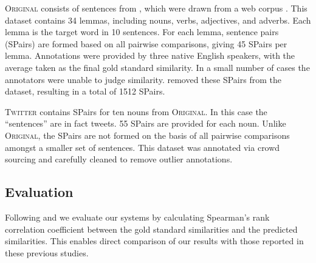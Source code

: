 \documentclass[11pt]{article}
\newcommand\original{\textsc{Original}\xspace}
\newcommand\twitter{\textsc{Twitter}\xspace}
\begin{document}
\original consists of sentences from \cite{McCarthy:Navigli:2007},
which were drawn from a web corpus \citep{Sharoff2006b}. This dataset
contains 34 lemmas, including nouns, verbs, adjectives, and
adverbs. Each lemma is the target word in 10 sentences. For each
lemma, sentence pairs (SPairs) are formed based on all pairwise
comparisons, giving 45 SPairs per lemma. Annotations were
provided by three native English speakers, with the average taken as
the final gold standard similarity. In a small number of cases the
annotators were unable to judge similarity. \citeauthor{Erk2009b}
removed these SPairs from the dataset, resulting in a total of
1512 SPairs.

\twitter contains SPairs for ten nouns from \original. In this
case the ``sentences'' are in fact tweets. 55 SPairs are
provided for each noun. Unlike \original, the SPairs are not
formed on the basis of all pairwise comparisons amongst a smaller set
of sentences. This dataset was annotated via crowd sourcing and
carefully cleaned to remove outlier annotations.









\subsection{Evaluation\label{sec:evaluation}}
Following \cite{LuiBaldwin2012} and \cite{Gella+:2013} we evaluate our
systems by calculating Spearman's rank correlation coefficient between
the gold standard similarities and the predicted similarities. This
enables direct comparison of our results with those reported in these
previous studies.



\end{document}
